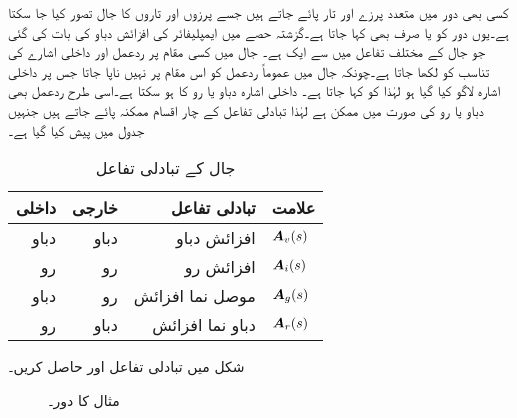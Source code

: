 کسی بھی دور میں متعدد پرزے اور تار پائے جاتے ہیں جسے پرزوں اور تاروں کا جال تصور کیا جا سکتا ہے۔یوں دور کو  یا صرف  بھی کہا جاتا ہے۔گزشتہ حصے میں ایمپلیفائر کی افزائش دباو  کی بات کی گئی جو جال کے مختلف تفاعل  میں سے ایک ہے۔ جال میں کسی مقام پر ردعمل اور داخلی اشارے کی تناسب کو  لکھا جاتا ہے۔چونکہ جال میں عموماً ردعمل کو اس مقام پر نہیں ناپا جاتا جس پر داخلی اشارہ لاگو کیا گیا ہو لہٰذا  کو   کہا جاتا ہے۔ داخلی اشارہ دباو یا رو کا ہو سکتا ہے۔اسی طرح ردعمل بھی دباو یا رو کی صورت میں ممکن ہے لہٰذا تبادلی تفاعل کے چار اقسام ممکنہ پائے جاتے ہیں جنہیں جدول  میں پیش کیا گیا ہے۔
\begin{table}\caption{جال کے تبادلی تفاعل}
\centering
\begin{tabular}{r r r l}
داخلی & خارجی& تبادلی تفاعل& علامت\\
\hline
دباو&دباو&افزائش دباو&${{\boldsymbol{A}}}_v(s)$ \\
رو&رو&افزائش رو&${{\boldsymbol{A}}}_i(s)$ \\
دباو&رو&موصل نما افزائش& ${{\boldsymbol{A}}}_g(s)$\\
رو&دباو&دباو نما افزائش&${{\boldsymbol{A}}}_r(s)$ 
\end{tabular}\label{جدول_تعددی_جال_تبادلی_تفاعل}
\end{table} 

شکل  میں تبادلی تفاعل  اور  حاصل کریں۔
\begin{figure}
\centering
{}
\caption{مثال  کا دور۔}
\label{شکل_تعددی_تبادلی_تفاعل_الف}
\end{figure}

